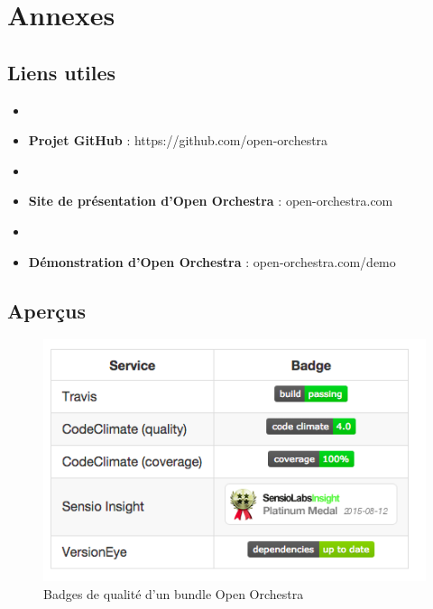 \chapter*{Annexes}
\section*{Liens utiles}
\begin{itemize}
\item[]
\item \textbf{Projet GitHub} : https://github.com/open-orchestra
\item[]
\item \textbf{Site de présentation d'Open Orchestra} : open-orchestra.com
\item[]
\item \textbf{Démonstration d'Open Orchestra} : open-orchestra.com/demo
\end{itemize}
\section*{Aperçus}


    \begin{figure}[H]
        \begin{center}
          \includegraphics[scale=0.75]{images/annexe_note}
        \end{center}
        \caption{Badges de qualité d'un bundle Open Orchestra}
        \label{annexe_note}
      \end{figure}
      

